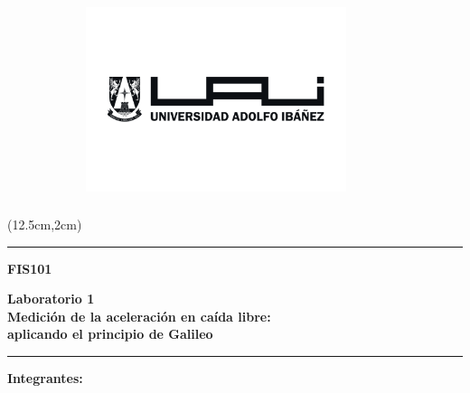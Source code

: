 \documentclass[twocolumn,12pt]{article}
\begin{document}
	
	\begin{titlepage}
		\centering
            \vspace*{-0.5in} %
		\vspace*{1in}
		
		\begin{textblock*}{0in}(12.5cm,2cm) %
			\includegraphics[width=3in,height=3in,keepaspectratio]{./Multimedia/logo_uai.png}
		\end{textblock*}
		
		\noindent\rule{1\textwidth}{0.4pt}
		\begin{flushleft}
			\textbf{FIS101}
		\end{flushleft}
		
		\vspace{0in} %
		
		\begin{flushleft}
			\huge
			\textbf{Laboratorio 1\\}
			\large
			\textbf{Medición de la aceleración en caída libre:\\ aplicando el principio de Galileo}
			\vspace{0.4in} %
		\end{flushleft}
		
		\noindent\rule{1\textwidth}{0.4pt}
		
		\vspace{0.8in}
		
		\large
		\begin{flushleft}
			\textbf{Integrantes:}
			

\end{flushleft}
\end{titlepage}
\end{document}
